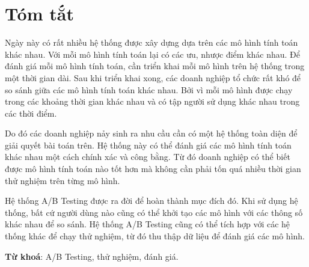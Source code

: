 \chapter*{Tóm tắt}

Ngày này có rất nhiều hệ thống được xây dựng dựa trên các mô hình tính toán khác nhau.
Với mỗi mô hình tính toán lại có các ưu, nhược điểm khác nhau.
Để đánh giá mỗi mô hình tính toán, cần triển khai mỗi mô hình trên hệ thống trong một thời gian dài.
Sau khi triển khai xong, các doanh nghiệp tổ chức rất khó để so sánh giữa các mô hình tính toán khác nhau.
Bởi vì mỗi mô hình được chạy trong các khoảng thời gian khác nhau và có tập người sử dụng khác nhau
trong các thời điểm.

Do đó các doanh nghiệp nảy sinh ra nhu cầu cần có một hệ thống toàn diện để giải quyết bài toán trên.
Hệ thống này có thể đánh giá các mô hình tính toán khác nhau một cách chính xác và công bằng.
Từ đó doanh nghiệp có thể biết được mô hình tính toán nào tốt hơn mà không cần phải tốn quá nhiều
thời gian thử nghiệm trên từng mô hình.

Hệ thống A/B Testing được ra đời để hoàn thành mục đích đó. Khi sử dụng hệ thống, bất cứ người dùng
nào cũng có thể khởi tạo các mô hình với các thông số khác nhau để so sánh. Hệ thống A/B Testing cũng
có thể tích hợp với các hệ thống khác để chạy thử nghiệm, từ đó thu thập dữ liệu để đánh giá các mô
hình.

\textbf{Từ khoá}: A/B Testing, thử nghiệm, đánh giá.
